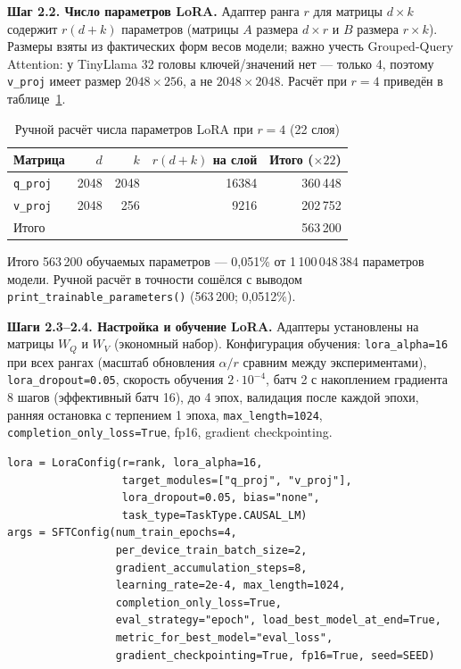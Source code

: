 \documentclass[14pt,a4paper]{extarticle}
\begin{document}
\textbf{Шаг 2.2. Число параметров LoRA.} Адаптер ранга $r$ для матрицы $d \times k$
содержит $r(d+k)$ параметров (матрицы $A$ размера $d \times r$ и $B$ размера $r \times k$).
Размеры взяты из фактических форм весов модели; важно учесть Grouped-Query Attention:
у TinyLlama 32 головы ключей/значений нет --- только 4, поэтому \texttt{v\_proj}
имеет размер $2048 \times 256$, а не $2048 \times 2048$. Расчёт при $r=4$ приведён
в таблице~\ref{tab:params}.

\begin{table}[H]
    \centering
    \caption*{\raggedleft Ручной расчёт числа параметров LoRA при $r=4$ (22 слоя)}
    \label{tab:params}
    \begin{tabular}{lrrrr}
        \toprule
        Матрица & $d$ & $k$ & $r(d+k)$ на слой & Итого ($\times 22$) \\
        \midrule
        \texttt{q\_proj} & 2048 & 2048 & 16384 & 360\,448 \\
        \texttt{v\_proj} & 2048 & 256  & 9216  & 202\,752 \\
        \midrule
        Итого & & & & 563\,200 \\
        \bottomrule
    \end{tabular}
\end{table}

Итого 563\,200 обучаемых параметров --- 0,051\% от 1\,100\,048\,384 параметров модели.
Ручной расчёт в точности сошёлся с выводом \texttt{print\_trainable\_parameters()}
(563\,200; 0,0512\%).

\textbf{Шаги 2.3--2.4. Настройка и обучение LoRA.} Адаптеры установлены на матрицы
$W_Q$ и $W_V$ (экономный набор). Конфигурация обучения: \texttt{lora\_alpha=16} при
всех рангах (масштаб обновления $\alpha/r$ сравним между экспериментами),
\texttt{lora\_dropout=0.05}, скорость обучения $2 \cdot 10^{-4}$, батч 2 с накоплением
градиента 8 шагов (эффективный батч 16), до 4 эпох, валидация после каждой эпохи,
ранняя остановка с терпением 1 эпоха, \texttt{max\_length=1024},
\texttt{completion\_only\_loss=True}, fp16, gradient checkpointing.

\begin{lstlisting}
lora = LoraConfig(r=rank, lora_alpha=16,
                  target_modules=["q_proj", "v_proj"],
                  lora_dropout=0.05, bias="none",
                  task_type=TaskType.CAUSAL_LM)
args = SFTConfig(num_train_epochs=4,
                 per_device_train_batch_size=2,
                 gradient_accumulation_steps=8,
                 learning_rate=2e-4, max_length=1024,
                 completion_only_loss=True,
                 eval_strategy="epoch", load_best_model_at_end=True,
                 metric_for_best_model="eval_loss",
                 gradient_checkpointing=True, fp16=True, seed=SEED)
\end{lstlisting}
\label{fig:lora}
\end{document}
